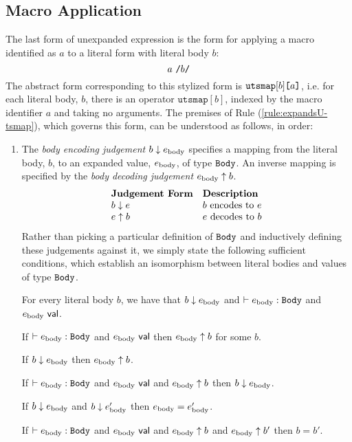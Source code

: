\subsection{Macro Application}
The last form of unexpanded expression is the form for applying a macro identified as $a$ to a literal form with literal body $b$:
\[
a~\texttt{/}b\texttt{/}
\] 
The abstract form corresponding to this stylized form is $\texttt{utsmap}[b]\texttt{[}a\texttt{]}$, i.e. for each literal body, $b$, there is an operator $\texttt{utsmap}[b]$, indexed by the macro identifier $a$ and taking no arguments. The premises of Rule (\ref{rule:expandsU-tsmap}), which governs this form, can be understood as follows, in order:
\begin{enumerate}
\item The \emph{body encoding judgement} $b \downarrow e_\text{body}$ specifies a mapping from the literal body, $b$, to an expanded value, $e_\text{body}$, of type $\mathtt{Body}$. An inverse mapping is specified by the \emph{body decoding judgement} $e_\text{body} \uparrow b$.
\[\begin{array}{ll}
\textbf{Judgement Form} & \textbf{Description}\\
b \downarrow e & \text{$b$ encodes to $e$}\\
e \uparrow b & \text{$e$ decodes to $b$}
\end{array}\]
Rather than picking a particular definition of $\mathtt{Body}$ and inductively defining these judgements against it, we simply state the following sufficient conditions, which establish an isomorphism between literal bodies and values of type $\mathtt{Body}$.
\begin{condition} For every literal body $b$, we have that $b \downarrow e_\text{body}$ and $\vdash e_\text{body} : \mathtt{Body}$ and $e_\text{body}~\mathsf{val}$. \end{condition}
\begin{condition} If $\vdash e_\text{body} : \mathtt{Body}$ and $e_\text{body}~\mathsf{val}$ then $e_\text{body} \uparrow b$ for some $b$. \end{condition}
\begin{condition} If $b \downarrow e_\text{body}$ then $e_\text{body} \uparrow b$. \end{condition}
\begin{condition} If $\vdash e_\text{body} : \mathtt{Body}$ and $e_\text{body}~\mathsf{val}$ and $e_\text{body} \uparrow b$ then $b \downarrow e_\text{body}$. \end{condition}
\begin{condition} If $b \downarrow e_\text{body}$ and $b \downarrow e_\text{body}'$ then $e_\text{body} = e_\text{body}'$. \end{condition}
\begin{condition} If $\vdash e_\text{body} : \mathtt{Body}$ and $e_\text{body}~\mathsf{val}$ and $e_\text{body} \uparrow b$ and $e_\text{body} \uparrow b'$ then $b=b'$. \end{condition}


\end{enumerate}

